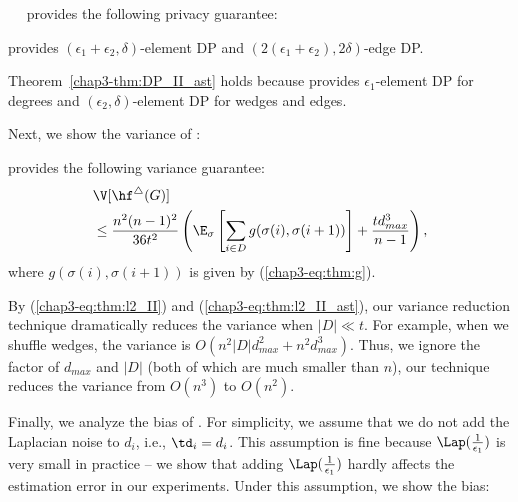 \smallskip
{}~~\AlgWSTriVR{} provides the following privacy guarantee: 

\begin{theorem}
\label{chap3-thm:DP_II_ast}
\AlgWSTri{} provides $(\epsilon_1 + \epsilon_2, \delta)$-element DP and $(2(\epsilon_1 + \epsilon_2), 2\delta)$-edge DP. 
\end{theorem}

Theorem~\ref{chap3-thm:DP_II_ast} holds because \AlgWSTri{} provides $\epsilon_1$-element DP for degrees and $(\epsilon_2, \delta)$-element DP for wedges and edges. 

Next, we show the variance of \AlgWSTriVR{}:

\begin{theorem}
\label{chap3-thm:var_II_ast}
\AlgWSTriVR{} provides the following variance guarantee:
\begin{align}
& \V[\hf^\triangle(G)] \nonumber\\ 
& \leq \frac{n^2(n-1)^2}{36t^2} \left(\E_\sigma \left[ \sum_{i \in D} 
g(\sigma(i),\sigma(i+1)) \right] + \frac{t d_{max}^3}{n-1}\right), \label{chap3-eq:thm:l2_II_ast}
\end{align}
where $g(\sigma(i),\sigma(i+1))$ is given by (\ref{chap3-eq:thm:g}). 
\end{theorem}
By (\ref{chap3-eq:thm:l2_II}) and (\ref{chap3-eq:thm:l2_II_ast}), our variance reduction technique dramatically reduces the variance when $|D| \ll t$. 
For example, when we shuffle wedges, the variance is $O(n^2|D|d_{max}^2 + n^2 d_{max}^3)$. 
Thus, we ignore the factor of $d_{max}$ and $|D|$ (both of which are much smaller than $n$), our technique reduces the variance from $O(n^3)$ to $O(n^2)$. 

Finally, we analyze the bias of \AlgWSTriVR{}. 
For simplicity, we assume that we do not add the Laplacian noise to $d_i$, i.e., $\td_i = d_i$. 
This assumption is fine because 
$\Lap(\frac{1}{\epsilon_1})$ is very small in practice -- we show that adding $\Lap(\frac{1}{\epsilon_1})$ hardly affects the estimation error in our experiments. 
Under this assumption, we show the bias: 

